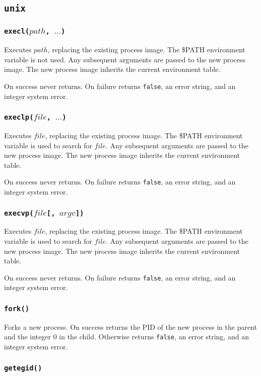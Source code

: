 \documentclass[11pt, oneside]{memoir}
\newcommand*{\false}[0]{\texttt{false}\xspace}
\newcommand*{\fn}[1]{\texttt{#1}\xspace}
\newcounter{toccols}
\newenvironment{Module}[1]{
	\subsection{\texttt{#1}}
	\addtocontents{toc}{
		\protect\begin{multicols}{\value{toccols}}
	}
}{
	\addtocontents{toc}{\protect\end{multicols}}
}
\begin{document}
\begin{Module}{unix}
\subsubsection[\fn{execl}]{\fn{execl($path$, $\ldots$)}}

Executes $path$, replacing the existing process image. The \$PATH environment variable is not used. Any subsequent arguments are passed to the new process image. The new process image inherits the current environment table.

On success never returns. On failure returns \false, an error string, and an integer system error.

\subsubsection[\fn{execlp}]{\fn{execlp($file$, $\ldots$)}}

Executes $file$, replacing the existing process image. The \$PATH environment variable is used to search for $file$. Any subsequent arguments are passed to the new process image. The new process image inherits the current environment table.

On success never returns. On failure returns \false, an error string, and an integer system error.

\subsubsection[\fn{execvp}]{\fn{execvp($file$[, $argv$])}}

Executes $file$, replacing the existing process image. The \$PATH environment variable is used to search for $file$. Any subsequent arguments are passed to the new process image. The new process image inherits the current environment table.

On success never returns. On failure returns \false, an error string, and an integer system error.

\subsubsection[\fn{fork}]{\fn{fork()}}

Forks a new process. On success returns the PID of the new process in the parent and the integer 0 in the child. Otherwise returns \false, an error string, and an integer system error.

\subsubsection[\fn{getegid}]{\fn{getegid()}}


\end{Module}
\end{document}
